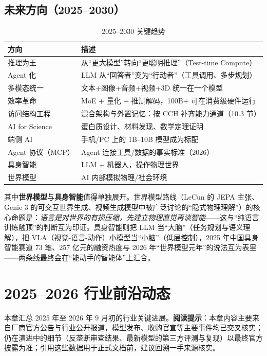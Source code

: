 \documentclass[12pt,a4paper]{article}
\begin{document}
\subsection{未来方向（2025--2030）}

\begin{table}[htbp]
\centering
\small
\begin{tabular}{@{}ll@{}}
\toprule
\textbf{方向} & \textbf{描述}\\
\midrule
推理为王 & 从“更大模型”转向“更聪明推理”（Test-time Compute）\\
Agent 化 & LLM 从“回答者”变为“行动者”（工具调用、多步规划）\\
多模态统一 & 文本+图像+音频+视频+3D 统一在一个模型\\
效率革命 & MoE + 量化 + 推测解码，100B+ 可在消费级硬件运行\\
访问结构工程 & 混合架构与外置记忆：按 CCH 补齐能力通道（10.3 节）\\
AI for Science & 蛋白质设计、材料发现、数学定理证明\\
端侧 AI & 手机/PC 上的 1B--10B 模型成为标配\\
Agent 协议（MCP） & Agent 连接工具/数据的事实标准（2026）\\
具身智能 & LLM + 机器人，操作物理世界\\
世界模型 & AI 内部模拟物理/社会环境\\
\bottomrule
\end{tabular}
\caption{2025--2030 关键趋势}
\end{table}

其中\textbf{世界模型}与\textbf{具身智能}值得单独展开。世界模型路线（LeCun 的 JEPA 主张、Genie 3 的可交互世界生成、视频生成模型中被广泛讨论的“隐式物理理解”）的核心命题是：\emph{语言是对世界的有损压缩，先建立物理直觉再谈智能}——这与“纯语言训练触顶”的判断互为印证。具身智能则把 LLM 当“大脑”（任务规划与语义理解），把 VLA（视觉-语言-动作）小模型当“小脑”（低层控制），2025 年中国具身智能赛道 73 笔、257 亿元的融资热度与 2026 年“世界模型元年”的说法互为表里——两条线最终会在“能动手的智能体”上汇合。

\section{2025--2026 行业前沿动态}

本章汇总 2025 年至 2026 年 9 月初的行业关键进展。\textbf{阅读提示}：本章内容主要来自厂商官方公告与行业公开报道，模型发布、收购官宣等主要事件均已交叉核实；仍在演进中的细节（反垄断审查结果、最新模型的第三方评测与复现）以最终官方披露为准；引用这些数据用于正式文档前，建议回溯一手来源核实。
\end{document}
